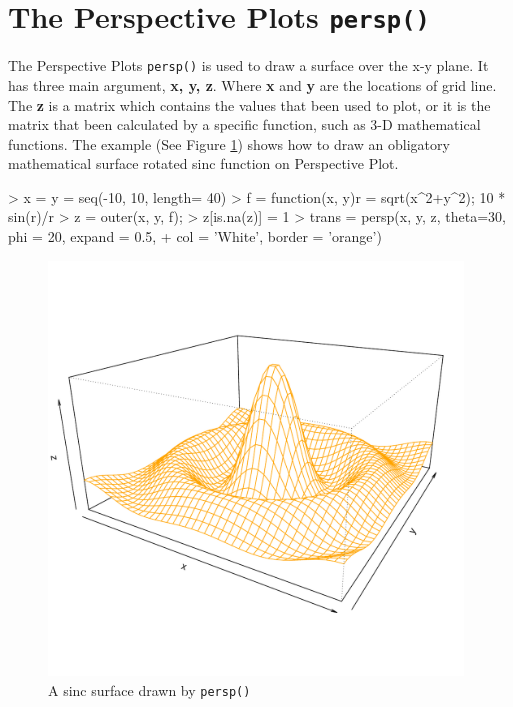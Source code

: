 \documentclass[11pt,twoside]{report}
\begin{document}
\section{The Perspective Plots \texttt{persp()}}
The Perspective Plots \texttt{persp()} is used to draw a surface over the x-y plane.  
It has three main argument, \textbf{x, y, z}. Where \textbf{x} and \textbf{y} are the locations of grid line. The \textbf{z} is a matrix which contains the values that been used to plot, or it is the matrix that been calculated by a specific function, such as 3-D mathematical functions. The example (See Figure \ref{figure_3.1}) shows how to draw an obligatory mathematical surface rotated sinc function on Perspective Plot.
\begin{Schunk}
\begin{Sinput}
> x = y = seq(-10, 10, length= 40)
> f = function(x, y){r = sqrt(x^2+y^2); 10 * sin(r)/r }
> z = outer(x, y, f);  
> z[is.na(z)] = 1
> trans = persp(x, y, z, theta=30, phi = 20, expand = 0.5,
+               col = 'White', border = 'orange')
\end{Sinput}
\end{Schunk}
\begin{figure}[h]
	\begin{center}
		\includegraphics[height = 11cm, width = 11cm]{figure/standalone_1.pdf}
		\caption{A sinc surface drawn by \texttt{persp()}}
		\label{figure_3.1}
	\end{center}
\end{figure}
\end{document}
